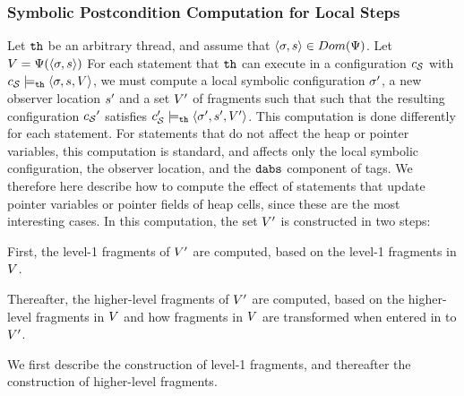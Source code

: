 \subsubsection{Symbolic Postcondition Computation for Local Steps}
Let ${\tt th}$ be an arbitrary thread, and assume
that $\left\langle\sigma,s\right\rangle \in Dom(\Psi)$.
Let $V = \Psi(\left\langle\sigma,s\right\rangle)$
For each statement that ${\tt th}$ can execute in a configuration $c_{\mathcal S}$
with $c_{\mathcal S} \models_{{\tt th}} \left\langle\sigma,s,V\right\rangle$,
we must compute a local symbolic configuration $\sigma'$, a new
observer location $s'$ and a set  $V'$ of fragments such that
such that the resulting configuration ${c_{\mathcal S}}'$ satisfies
$c_{\mathcal S}' \models_{{\tt th}} \left\langle\sigma',s',V'\right\rangle$.
This computation is done differently for
each statement. For statements that do not affect the heap or pointer variables,
this computation is standard, and affects only the local symbolic
configuration, the observer location, and the $\mathtt{dabs}$ component of
tags.
We therefore here describe how to compute the effect of statements that update
pointer variables or pointer fields of heap cells,
since these are the most interesting cases.
In this computation, the set $V'$ is constructed in two steps:
\begin{inparaenum}[(1)]
\item First, the level-1 fragments of $V'$ are computed, based on
  the level-1 fragments in $V$.
\item
  Thereafter, the higher-level fragments of $V'$ are computed, based
  on the higher-level fragments in $V$ and
  how fragments in $V$ are transformed
  when entered in to $V'$.
\end{inparaenum}
We first describe the construction of level-1 fragments, and thereafter the
construction of higher-level fragments.

